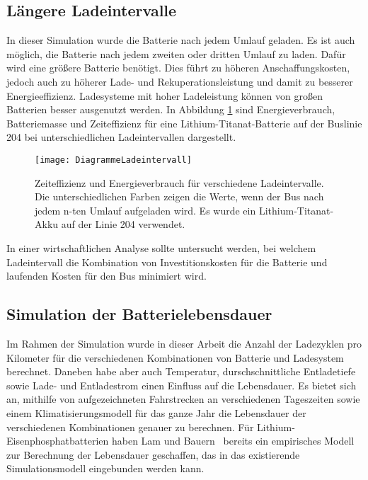 \subsection{Längere Ladeintervalle} In dieser Simulation wurde die Batterie nach jedem Umlauf geladen. Es ist auch möglich, die Batterie nach jedem zweiten oder dritten Umlauf zu laden. Dafür wird eine größere Batterie benötigt. Dies führt zu höheren Anschaffungskosten, jedoch auch zu höherer Lade- und Rekuperationsleistung und damit zu besserer Energieeffizienz. Ladesysteme mit hoher Ladeleistung können von großen Batterien besser ausgenutzt werden. In Abbildung \ref{abb_DiagrammLadeintervalle} sind Energieverbrauch, Batteriemasse und Zeiteffizienz für eine Lithium-Titanat-Batterie auf der Buslinie 204 bei unterschiedlichen Ladeintervallen dargestellt.

\begin{figure}\centering
	\texttt{[image: DiagrammeLadeintervall]}
	\caption[Zeiteffizienz und Energieverbrauch für verschiedene Ladeintervalle]{Zeiteffizienz und Energieverbrauch für verschiedene Ladeintervalle. Die unterschiedlichen Farben zeigen die Werte, wenn der Bus nach jedem n-ten Umlauf aufgeladen wird. Es wurde ein Lithium-Titanat-Akku auf der Linie 204 verwendet.}
	\label{abb_DiagrammLadeintervalle}
\end{figure}

In einer wirtschaftlichen Analyse sollte untersucht werden, bei welchem Ladeintervall die Kombination von Investitionskosten für die Batterie und laufenden Kosten für den Bus minimiert wird. 

\subsection{Simulation der Batterielebensdauer}
Im Rahmen der Simulation wurde in dieser Arbeit die Anzahl der Ladezyklen pro Kilometer für die verschiedenen Kombinationen von Batterie und Ladesystem berechnet. Daneben habe aber auch Temperatur, durschschnittliche Entladetiefe sowie Lade- und Entladestrom einen Einfluss auf die Lebensdauer. Es bietet sich an, mithilfe von aufgezeichneten Fahrstrecken an verschiedenen Tageszeiten sowie einem Klimatisierungsmodell für das ganze Jahr die Lebensdauer der verschiedenen Kombinationen genauer zu berechnen. Für Lithium-Eisenphosphatbatterien haben Lam und Bauern~\cite{lam2013practical} bereits ein empirisches Modell zur Berechnung der Lebensdauer geschaffen, das in das existierende Simulationsmodell eingebunden werden kann.

